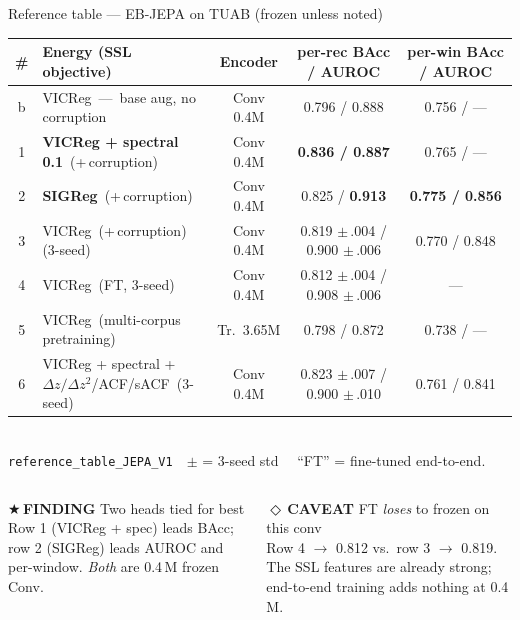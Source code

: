 \documentclass[aspectratio=169,11pt]{beamer}
\newcommand{\caveattag}{\textcolor{tplred}{\scriptsize\sffamily\bfseries$\Diamond$\,CAVEAT}\xspace}
\newcommand{\findingtag}{\textcolor{tplgold}{\scriptsize\sffamily\bfseries$\bigstar$\,FINDING}\xspace}
\newcommand{\sectionheader}[1]{\renewcommand{\insertsection}{#1}}
\begin{document}
\sectionheader{EVALUATION \,\textperiodcentered\, 1/3 \,\,\,\,EB-JEPA on TUAB}
\begin{frame}{Reference table --- EB-JEPA on TUAB (frozen unless noted)}
\centering\small
\begin{tabular}{@{}clccc@{}}
\toprule
\textbf{\#} & \textbf{Energy (SSL objective)} & \textbf{Encoder} & \textbf{per-rec BAcc / AUROC} & \textbf{per-win BAcc / AUROC} \\
\midrule
b & VICReg \,---\, base aug, no corruption                      & Conv 0.4M & 0.796 / 0.888 & 0.756 / --- \\
1 & \textbf{VICReg + spectral 0.1} \,(+\,corruption)               & Conv 0.4M & \textcolor{tplgreen}{\textbf{0.836 / 0.887}} & 0.765 / --- \\
2 & \textbf{SIGReg} \,(+\,corruption)                              & Conv 0.4M & 0.825 / \textcolor{tplgreen}{\textbf{0.913}} & \textcolor{tplgreen}{\textbf{0.775 / 0.856}} \\
3 & VICReg \,(+\,corruption) \,(3-seed)                            & Conv 0.4M & 0.819 $\pm$\,.004 / 0.900 $\pm$\,.006 & 0.770 / 0.848 \\
4 & VICReg \,(FT, 3-seed)                                          & Conv 0.4M & 0.812 $\pm$\,.004 / 0.908 $\pm$\,.006 & --- \\
5 & VICReg \,(multi-corpus pretraining)                            & Tr.\ 3.65M & 0.798 / 0.872 & 0.738 / --- \\
6 & VICReg + spectral + $\Delta z/\Delta z^2$/ACF/sACF \,(3-seed)  & Conv 0.4M & 0.823 $\pm$\,.007 / 0.900 $\pm$\,.010 & 0.761 / 0.841 \\
\bottomrule
\end{tabular}\\[0.3em]
{\scriptsize\textcolor{tplsec}{\texttt{reference\_table\_JEPA\_V1}\,\,\textperiodcentered\,\, $\pm$ = 3-seed std \,\,\textperiodcentered\,\, ``FT'' = fine-tuned end-to-end.}}

\vspace{0.4em}
\begin{columns}[T,onlytextwidth]
\begin{findingbox}\findingtag Two heads tied for best\\[0.2em]
\small Row 1 (VICReg + spec) leads BAcc; row 2 (SIGReg) leads AUROC and
per-window. \emph{Both} are 0.4\,M frozen Conv.
\end{findingbox}
\begin{caveatbox}\caveattag FT \emph{loses} to frozen on this conv\\[0.2em]
\small Row 4 $\to$ 0.812 vs.\ row 3 $\to$ 0.819. The SSL features are already
strong; end-to-end training adds nothing at 0.4\,M.
\end{caveatbox}
\end{columns}
\end{frame}
\end{document}

